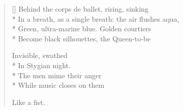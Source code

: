 \begin{verse}[\versewidth]
Behind the corps de ballet, rising, sinking\\*
In a breath, as a single breath: the air flushes aqua,\\*
Green, ultra-marine blue. Golden courtiers\\*
Become black silhouettes, the Queen-to-be

Invisible, swathed\\*
In Stygian night.\\*
The men mime their anger\\*
While music closes on them

Like a fist.
\end{verse}

